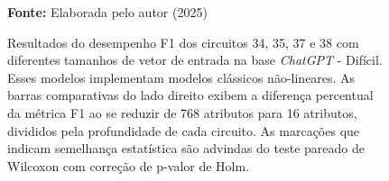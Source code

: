 \begin{figure}
\caption{Resultados do desempenho F1 dos circuitos 34, 35, 37 e 38 com diferentes tamanhos de vetor de entrada na base \textit{ChatGPT} - Difícil. Esses modelos implementam modelos clássicos não-lineares. As barras comparativas do lado direito exibem a diferença percentual da métrica F1 ao se reduzir de 768 atributos para 16 atributos, divididos pela profundidade de cada circuito. As marcações que indicam semelhança estatística são advindas do teste pareado de Wilcoxon com correção de p-valor de Holm.}
\label{fig:n_features:hard:g5}
     \centering
    \centering
      \par\medskip\ABNTEXfontereduzida\selectfont\textbf{Fonte:} Elaborada pelo autor (2025) \par\medskip
\end{figure}